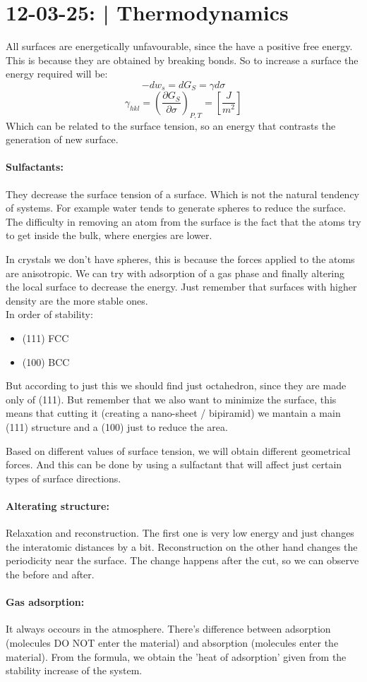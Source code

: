 \section{12-03-25: | Thermodynamics}

All surfaces are energetically unfavourable, since the have a positive free energy. This is because they are obtained by breaking bonds. So to increase a surface the energy required will be:
\begin{equation}
    -dw_s = dG_S = \gamma d\sigma 
\end{equation}
\begin{equation}
    \gamma_{hkl} = \left(\frac{\partial G_S}{\partial \sigma}\right)_{P,T} = \left[\frac{J}{m^2}\right]
\end{equation}
Which can be related to the surface tension, so an energy that contrasts the generation of new surface.

\paragraph{Sulfactants:} They decrease the surface tension of a surface. Which is not the natural tendency of systems. For example water tends to generate spheres to reduce the surface. The difficulty in removing an atom from the surface is the fact that the atoms try to get inside the bulk, where energies are lower. 

In crystals we don't have spheres, this is because the forces applied to the atoms are anisotropic. We can try with adsorption of a gas phase and finally altering the local surface to decrease the energy. Just remember that surfaces with higher density are the more stable ones.
\\In order of stability:
\begin{itemize}
    \item (111) FCC
    \item (100) BCC
\end{itemize}
But according to just this we should find just octahedron, since they are made only of (111). But remember that we also want to minimize the surface, this means that cutting it (creating a nano-sheet / bipiramid) we mantain a main (111) structure and a (100) just to reduce the area.

Based on different values of surface tension, we will obtain different geometrical forces.
And this can be done by using a sulfactant that will affect just certain types of surface directions.

\paragraph{Alterating structure:} Relaxation and reconstruction. The first one is very low energy and just changes the interatomic distances by a bit. Reconstruction on the other hand changes the periodicity near the surface. The change happens after the cut, so we can observe the before and after.

\paragraph{Gas adsorption:} It always occours in the atmosphere. There's difference between adsorption (molecules DO NOT enter the material) and absorption (molecules enter the material). From the formula, we obtain the 'heat of adsorption' given from the stability increase of the system.